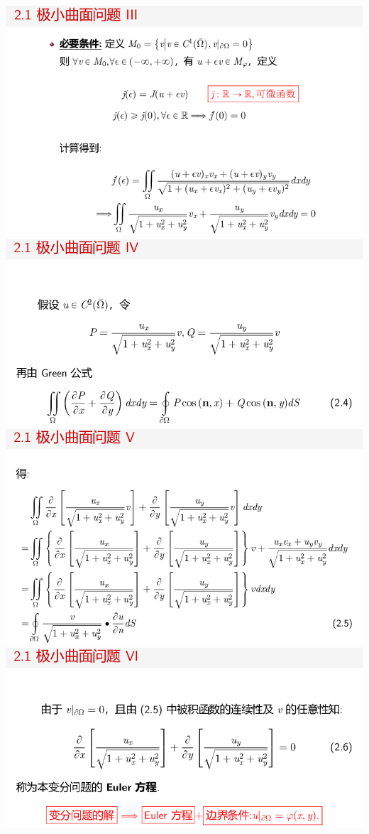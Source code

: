\documentclass[11pt,a4paper]{ctexart}
\begin{document}
\begin{paracol}{2}
\includegraphics[width=\linewidth]{chap01_52.png}
\includegraphics[width=\linewidth]{chap01_53.png}
\newpage
\includegraphics[width=\linewidth]{chap01_54.png}
\includegraphics[width=\linewidth]{chap01_55.png}

\end{paracol}
\end{document}
